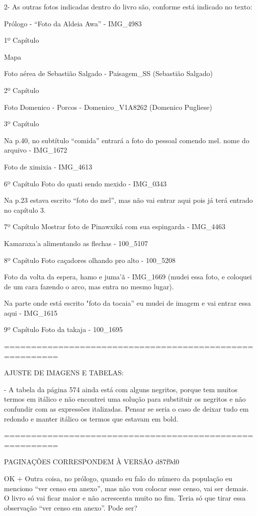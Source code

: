 2- As outras fotos indicadas dentro do livro são, conforme está indicado no texto:

Prólogo - “Foto da Aldeia Awa”  - IMG_4983


1º Capítulo

Mapa

Foto aérea de Sebastião Salgado - Paisagem_SS (Sebastião Salgado)


2º Capítulo

Foto Domenico - Porcos - Domenico_V1A8262 (Domenico Pugliese)


3º Capítulo

Na p.40, no subtítulo “comida” entrará a foto do pessoal comendo mel. nome do arquivo - IMG_1672

Foto de ximixia - IMG_4613


6º Capítulo
Foto do quati sendo mexido - IMG_0343

Na p.23 estava escrito “foto do mel”, mas não vai entrar aqui pois já terá entrado no capítulo 3.


7º Capítulo
Mostrar foto de Pinawxiká com sua espingarda - IMG_4463

Kamaraxa’a alimentando as flechas - 100_5107


8º Capítulo
Foto caçadores olhando pro alto - 100_5208

Foto da volta da espera, hamo e juma’ã - IMG_1669 (mudei essa foto, e coloquei de um cara fazendo o arco, mas entra no mesmo lugar).

Na parte onde está escrito "foto da tocaia” eu mudei de imagem e vai entrar essa aqui - IMG_1615


9º Capítulo
Foto da takaja - 100_1695

========================================================

AJUSTE DE IMAGENS E TABELAS:

- A tabela da página 574 ainda está com alguns negritos, porque tem muitos termos em itálico e não encontrei uma solução para substituir os negritos e não confundir com as expressões italizadas. Pensar se seria o caso de deixar tudo em redondo e manter itálico os termos que estavam em bold.

========================================================

PAGINAÇÕES CORRESPONDEM À VERSÃO d87f9d0

OK + Outra coisa, no prólogo, quando eu falo do número da população eu menciono “ver censo em anexo”, mas não vou colocar esse censo, vai ser demais. O livro só vai ficar maior e não acrescenta muito no fim. 
Teria só que tirar essa observação “ver censo em anexo”. Pode ser?

